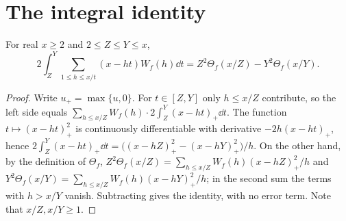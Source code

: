 \section{The integral identity}

\begin{lemma}\label{lem:integral-identity}
For real $x\ge2$ and $2\le Z\le Y\le x$,
\[
2\int_Z^Y\sum_{1\le h\le x/t}(x-ht)W_f(h)\dd t=Z^2\Theta_f(x/Z)-Y^2\Theta_f(x/Y).
\]
\end{lemma}

\begin{proof}
Write $u_+=\max\{u,0\}$. For $t\in[Z,Y]$ only $h\le x/Z$ contribute, so the left side equals $\sum_{h\le x/Z}W_f(h)\cdot2\int_Z^Y(x-ht)_+\dd t$. The function $t\mapsto(x-ht)_+^2$ is continuously differentiable with derivative $-2h(x-ht)_+$, hence $2\int_Z^Y(x-ht)_+\dd t=\bigl((x-hZ)_+^2-(x-hY)_+^2\bigr)/h$. On the other hand, by the definition of $\Theta_f$, $Z^2\Theta_f(x/Z)=\sum_{h\le x/Z}W_f(h)(x-hZ)_+^2/h$ and $Y^2\Theta_f(x/Y)=\sum_{h\le x/Z}W_f(h)(x-hY)_+^2/h$; in the second sum the terms with $h>x/Y$ vanish. Subtracting gives the identity, with no error term. Note that $x/Z,x/Y\ge1$.
\end{proof}

